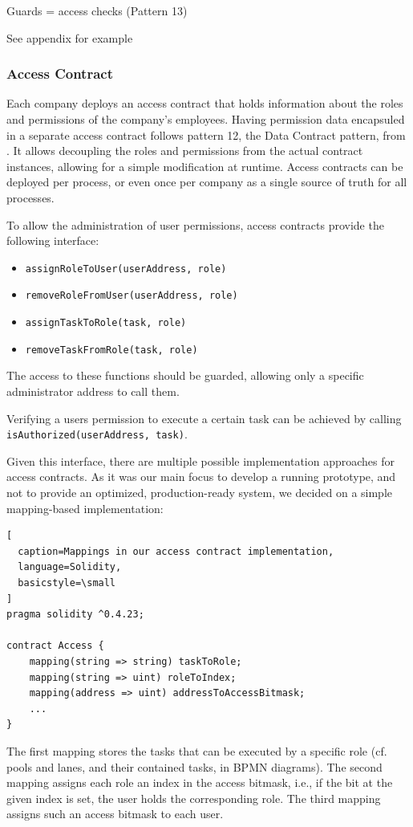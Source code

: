 \documentclass[runningheads]{llncs}
\begin{document}
Guards = access checks (Pattern 13)

See appendix for example %

\subsubsection{Access Contract}

Each company deploys an access contract that holds information about the roles and permissions of the company's employees.
Having permission data encapsuled in a separate access contract follows pattern 12, the Data Contract pattern, from \cite{xu2018pattern}.
It allows decoupling the roles and permissions from the actual contract instances, allowing for a simple modification at runtime.
Access contracts can be deployed per process, or even once per company as a single source of truth for all processes.

To allow the administration of user permissions, access contracts provide the following interface:
\begin{itemize}
  \item 
    \texttt{assignRoleToUser(userAddress, role)}
  \item
    \texttt{removeRoleFromUser(userAddress, role)}
  \item
    \texttt{assignTaskToRole(task, role)}
  \item
    \texttt{removeTaskFromRole(task, role)}
\end{itemize}
The access to these functions should be guarded, allowing only a specific administrator address to call them.

Verifying a users permission to execute a certain task can be achieved by calling \texttt{isAuthorized(userAddress, task)}.
\newline

Given this interface, there are multiple possible implementation approaches for access contracts.
As it was our main focus to develop a running prototype, and not to provide an optimized, production-ready system, we decided on a simple mapping-based implementation:
\begin{lstlisting}[
  caption=Mappings in our access contract implementation,
  language=Solidity,
  basicstyle=\small
]
pragma solidity ^0.4.23;

contract Access {
    mapping(string => string) taskToRole;
    mapping(string => uint) roleToIndex;
    mapping(address => uint) addressToAccessBitmask;
    ...
}
\end{lstlisting}
The first mapping stores the tasks that can be executed by a specific role (cf. pools and lanes, and their contained tasks, in BPMN diagrams).
The second mapping assigns each role an index in the access bitmask, i.e., if the bit at the given index is set, the user holds the corresponding role.
The third mapping assigns such an access bitmask to each user.
\end{document}
